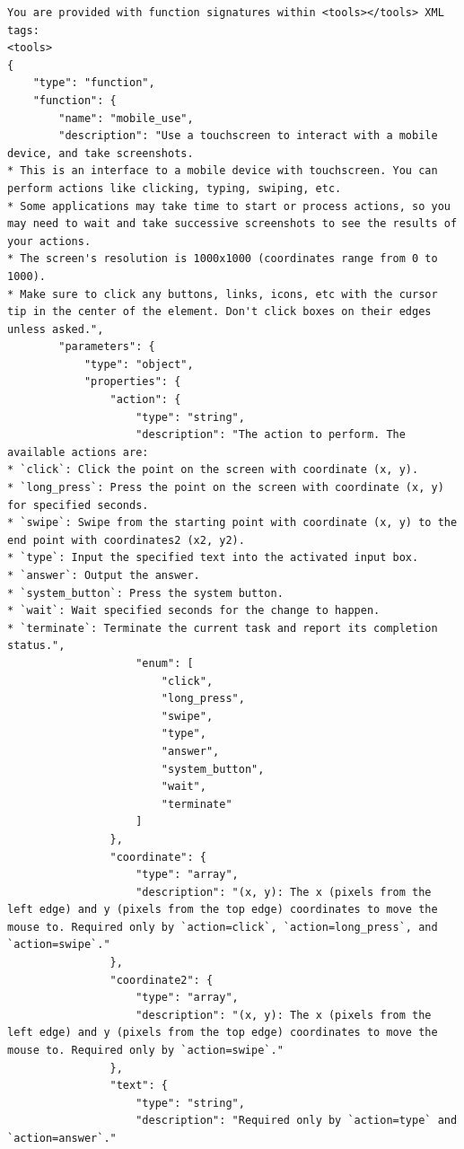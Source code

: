 \begin{tcolorbox}[
  promptstyle,
  title=\texttt{Prompt for ReAct-Style Qwen3-VL (system prompt).},
]
\begin{Verbatim}[fontsize=\scriptsize,breaklines,breakanywhere]
You are provided with function signatures within <tools></tools> XML tags:
<tools>
{
    "type": "function",
    "function": {
        "name": "mobile_use",
        "description": "Use a touchscreen to interact with a mobile device, and take screenshots.
* This is an interface to a mobile device with touchscreen. You can perform actions like clicking, typing, swiping, etc.
* Some applications may take time to start or process actions, so you may need to wait and take successive screenshots to see the results of your actions.
* The screen's resolution is 1000x1000 (coordinates range from 0 to 1000).
* Make sure to click any buttons, links, icons, etc with the cursor tip in the center of the element. Don't click boxes on their edges unless asked.",
        "parameters": {
            "type": "object",
            "properties": {
                "action": {
                    "type": "string",
                    "description": "The action to perform. The available actions are:
* `click`: Click the point on the screen with coordinate (x, y).
* `long_press`: Press the point on the screen with coordinate (x, y) for specified seconds.
* `swipe`: Swipe from the starting point with coordinate (x, y) to the end point with coordinates2 (x2, y2).
* `type`: Input the specified text into the activated input box.
* `answer`: Output the answer.
* `system_button`: Press the system button.
* `wait`: Wait specified seconds for the change to happen.
* `terminate`: Terminate the current task and report its completion status.",
                    "enum": [
                        "click",
                        "long_press",
                        "swipe",
                        "type",
                        "answer",
                        "system_button",
                        "wait",
                        "terminate"
                    ]
                },
                "coordinate": {
                    "type": "array",
                    "description": "(x, y): The x (pixels from the left edge) and y (pixels from the top edge) coordinates to move the mouse to. Required only by `action=click`, `action=long_press`, and `action=swipe`."
                },
                "coordinate2": {
                    "type": "array",
                    "description": "(x, y): The x (pixels from the left edge) and y (pixels from the top edge) coordinates to move the mouse to. Required only by `action=swipe`."
                },
                "text": {
                    "type": "string",
                    "description": "Required only by `action=type` and `action=answer`."

\end{Verbatim}
\end{tcolorbox}
